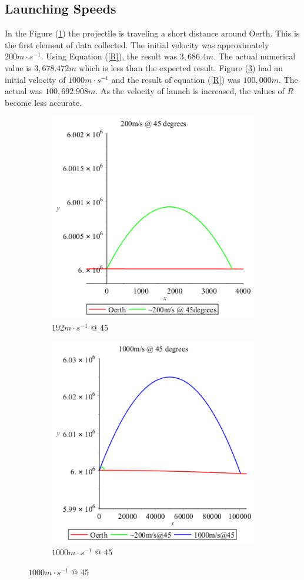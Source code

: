 \documentclass[12pt]{extarticle}
\begin{document}
\subsection{Launching Speeds}
In the Figure (\ref{fig:img1}) the projectile is traveling a short distance around Oerth. This is the first element of data collected. The initial velocity was approximately $200m\cdot s^{-1}$. Using Equation (\ref{R}), the result was $3,686.4m$. The actual numerical value is $3,678.472m$ which is less than the expected result. Figure (\ref{fig:img2}) had an initial velocity of $1000m\cdot s^{-1}$ and the result of equation (\ref{R}) was $100,000m$. The actual was $100,692.908m$. As the velocity of launch is increased, the values of $R$ become less accurate.
\begin{figure}[h!]
	\caption{Launching at Smaller Velocities}
	\begin{subfigure}{0.50\textwidth}
		\includegraphics[scale=0.55]{First.png}
		\caption{$192m\cdot s^{-1}$ @ 45}
		\label{fig:img1}
	\end{subfigure}
	\begin{subfigure}{0.50\textwidth}
		\includegraphics[scale=0.55]{Second.png}
		\caption{$1000m\cdot s^{-1}$ @ 45}
		\label{fig:img2}
	\end{subfigure}
\end{figure}
\end{document}
